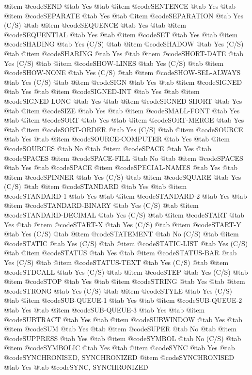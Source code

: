 @item @code{SEND} @tab Yes @tab 
@item @code{SENTENCE} @tab Yes @tab 
@item @code{SEPARATE} @tab Yes @tab 
@item @code{SEPARATION} @tab Yes	(C/S) @tab 
@item @code{SEQUENCE} @tab Yes @tab 
@item @code{SEQUENTIAL} @tab Yes @tab 
@item @code{SET} @tab Yes @tab 
@item @code{SHADING} @tab Yes	(C/S) @tab 
@item @code{SHADOW} @tab Yes	(C/S) @tab 
@item @code{SHARING} @tab Yes @tab 
@item @code{SHORT-DATE} @tab Yes	(C/S) @tab 
@item @code{SHOW-LINES} @tab Yes	(C/S) @tab 
@item @code{SHOW-NONE} @tab Yes	(C/S) @tab 
@item @code{SHOW-SEL-ALWAYS} @tab Yes	(C/S) @tab 
@item @code{SIGN} @tab Yes @tab 
@item @code{SIGNED} @tab Yes @tab 
@item @code{SIGNED-INT} @tab Yes @tab 
@item @code{SIGNED-LONG} @tab Yes @tab 
@item @code{SIGNED-SHORT} @tab Yes @tab 
@item @code{SIZE} @tab Yes @tab 
@item @code{SMALL-FONT} @tab Yes @tab 
@item @code{SORT} @tab Yes @tab 
@item @code{SORT-MERGE} @tab Yes @tab 
@item @code{SORT-ORDER} @tab Yes	(C/S) @tab 
@item @code{SOURCE} @tab Yes @tab 
@item @code{SOURCE-COMPUTER} @tab Yes @tab 
@item @code{SOURCES} @tab No @tab 
@item @code{SPACE} @tab Yes @tab @code{SPACES}
@item @code{SPACE-FILL} @tab No @tab 
@item @code{SPACES} @tab Yes @tab @code{SPACE}
@item @code{SPECIAL-NAMES} @tab Yes @tab 
@item @code{SPINNER} @tab Yes	(C/S) @tab 
@item @code{SQUARE} @tab Yes	(C/S) @tab 
@item @code{STANDARD} @tab Yes @tab 
@item @code{STANDARD-1} @tab Yes @tab 
@item @code{STANDARD-2} @tab Yes @tab 
@item @code{STANDARD-BINARY} @tab Yes	(C/S) @tab 
@item @code{STANDARD-DECIMAL} @tab Yes	(C/S) @tab 
@item @code{START} @tab Yes @tab 
@item @code{START-X} @tab Yes	(C/S) @tab 
@item @code{START-Y} @tab Yes	(C/S) @tab 
@item @code{STATEMENT} @tab No	(C/S) @tab 
@item @code{STATIC} @tab Yes	(C/S) @tab 
@item @code{STATIC-LIST} @tab Yes	(C/S) @tab 
@item @code{STATUS} @tab Yes @tab 
@item @code{STATUS-BAR} @tab Yes	(C/S) @tab 
@item @code{STATUS-TEXT} @tab Yes	(C/S) @tab 
@item @code{STDCALL} @tab Yes	(C/S) @tab 
@item @code{STEP} @tab Yes	(C/S) @tab 
@item @code{STOP} @tab Yes @tab 
@item @code{STRING} @tab Yes @tab 
@item @code{STRONG} @tab Yes	(C/S) @tab 
@item @code{STYLE} @tab Yes	(C/S) @tab 
@item @code{SUB-QUEUE-1} @tab Yes @tab 
@item @code{SUB-QUEUE-2} @tab Yes @tab 
@item @code{SUB-QUEUE-3} @tab Yes @tab 
@item @code{SUBTRACT} @tab Yes @tab 
@item @code{SUBWINDOW} @tab Yes @tab 
@item @code{SUM} @tab Yes @tab 
@item @code{SUPER} @tab No @tab 
@item @code{SUPPRESS} @tab Yes @tab 
@item @code{SYMBOL} @tab No	(C/S) @tab 
@item @code{SYMBOLIC} @tab Yes @tab 
@item @code{SYNC} @tab Yes @tab @code{SYNCHRONISED, SYNCHRONIZED}
@item @code{SYNCHRONISED} @tab Yes @tab @code{SYNC, SYNCHRONIZED}
